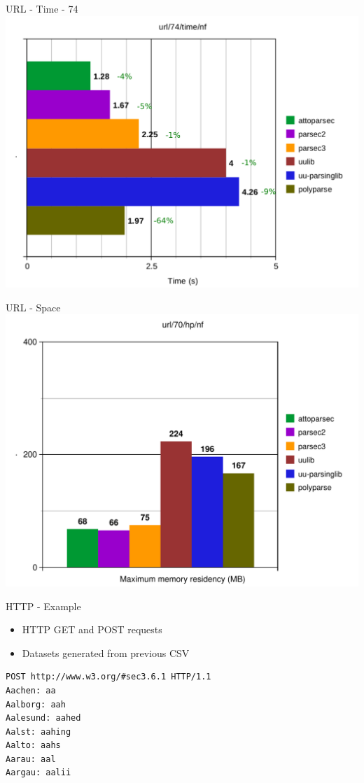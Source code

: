 \documentclass{beamer}
\begin{document}
\begin{frame}{URL - Time - 74}
\includegraphics[scale=0.5]{presentation/url-74-time-nf_.pdf}
\end{frame}

\begin{frame}{URL - Space}
\includegraphics[scale=0.5]{presentation/url-70-hp-nf.pdf}
\end{frame}

\begin{frame}[fragile]{HTTP - Example}
\begin{itemize}
\item HTTP GET and POST requests
\item Datasets generated from previous CSV
\end{itemize}
\begin{verbatim}
POST http://www.w3.org/#sec3.6.1 HTTP/1.1
Aachen: aa
Aalborg: aah
Aalesund: aahed
Aalst: aahing
Aalto: aahs
Aarau: aal
Aargau: aalii
\end{verbatim}
\end{frame}
\end{document}
